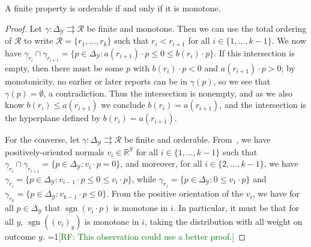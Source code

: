 \documentclass[11pt]{colt2019}
\newcommand{\Comments}{1}
\newcommand{\mynote}[2]{\ifnum\Comments=1\textcolor{#1}{#2}\fi}
\newcommand{\raf}[1]{\mynote{green}{[RF: #1]}}
\newcommand{\reals}{\mathbb{R}}
\newcommand{\simplex}{\Delta_\Y}
\newcommand{\R}{\mathcal{R}}
\newcommand{\Y}{\mathcal{Y}}
\newcommand{\toto}{\rightrightarrows}
\newcommand{\ones}{\mathbbm{1}}
\DeclareMathOperator*{\sgn}{sgn}
\begin{document}
\begin{lemma}\label{lem:orderable-monotone}
  A finite property is orderable if and only if it is monotone.
\end{lemma}
\begin{proof}
  Let $\gamma:\simplex\toto\R$ be finite and monotone.
  Then we can use the total ordering of $\R$ to write $\R = \{r_1,\ldots,r_k\}$ such that $r_i < r_{i+1}$ for all $i \in \{1,\ldots,k-1\}$.
  We now have $\gamma_{r_i} \cap \gamma_{r_{i+1}} = \{p\in\simplex : a(r_{i+1}) \cdot p \leq 0 \leq b(r_i) \cdot p\}$.
  If this intersection is empty, then there must be some $p$ with $b(r_i) \cdot p < 0$ and $a(r_{i+1}) \cdot p > 0$; by monotonicity, no earlier or later reports can be in $\gamma(p)$, so we see that $\gamma(p) = \emptyset$, a contradiction.
  Thus the intersection is nonempty, and as we also know $b(r_i) \leq a(r_{i+1})$ we conclude $b(r_i) = a(r_{i+1})$, and the intersection is the hyperplane defined by $b(r_i) = a(r_{i+1})$.

  For the converse, let $\gamma:\simplex\toto\R$ be finite and orderable.
  From~\cite[Theorem 4]{lambert2018elicitation}, we have positively-oriented normals $v_i\in\reals^\Y$ for all $i \in \{1,\ldots,k-1\}$ such that $\gamma_{r_i} \cap \gamma_{r_{i+1}} = \{p\in\simplex : v_i\cdot p = 0\}$, and moreover, for all $i \in \{2,\ldots,k-1\}$, we have $\gamma_{r_i} = \{p\in\simplex : v_{i-1} \cdot p \leq 0 \leq v_i \cdot p\}$, while $\gamma_{r_1} = \{p\in\simplex : 0 \leq v_1 \cdot p\}$ and $\gamma_{r_k} = \{p\in\simplex : v_{k-1} \cdot p \leq 0\}$.
  From the positive orientation of the $v_i$, we have for all $p\in\simplex$ that $\sgn(v_i\cdot p)$ is monotone in $i$.
  In particular, it must be that for all $y$, $\sgn((v_i)_y)$ is monotone in $i$, taking the distribution with all weight on outcome $y$.
  \raf{This observation could use a better proof.}
  

\end{proof}
\end{document}
